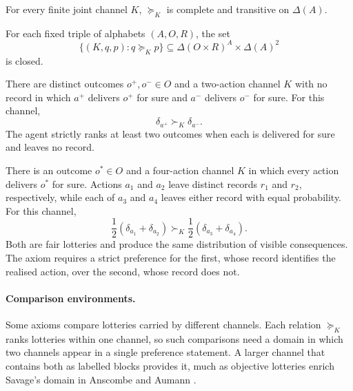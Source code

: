 \documentclass[11pt,a4paper]{article}
\theoremstyle{definition}
\newcommand{\D}{\Delta}
\newcommand{\1}{\mathbf 1}
\begin{document}
\begin{description}[leftmargin=*,style=sameline]

\item[(A1) Weak order.]
For every finite joint channel $K$, $\succeq_K$ is complete and transitive on $\D(A)$.

\item[(A2) Continuity.]
For each fixed triple of alphabets $(A,O,R)$, the set
\[
 \{(K,q,p):q\succeq_Kp\}
 \subseteq \D(O\times R)^A\times\D(A)^2
\]
is closed.


\item[(A3) Material relevance.]
There are distinct outcomes $o^+,o^-\in O$ and a two-action channel $K$ with no record in which $a^+$ delivers
$o^+$ for sure and $a^-$ delivers $o^-$ for sure.  For this channel,
\[
 \delta_{a^+}\succ_K\delta_{a^-}.
\]
The agent strictly ranks at least two outcomes when each is delivered for sure and leaves no record.

\item[(A4) Trace relevance.]
There is an outcome $o^\ast\in O$ and a four-action channel $K$ in which every action delivers $o^\ast$ for
sure.  Actions $a_1$ and $a_2$ leave distinct records $r_1$ and $r_2$, respectively, while each of $a_3$ and
$a_4$ leaves either record with equal probability.  For this channel,
\[
 \frac12(\delta_{a_1}+\delta_{a_2})
 \succ_K
 \frac12(\delta_{a_3}+\delta_{a_4}).
\]
Both are fair lotteries and produce the same distribution of visible consequences. The axiom requires a strict
preference for the first, whose record identifies the realised action, over the second, whose record does not.

\end{description}

\paragraph{Comparison environments.}
Some axioms compare lotteries carried by different channels.  Each relation $\succeq_K$ ranks lotteries within
one channel, so such comparisons need a domain in which two channels appear in a single preference statement.  A
larger channel that contains both as labelled blocks provides it, much as objective lotteries enrich Savage's
domain in Anscombe and Aumann \cite{AnscombeAumann1963}.
\end{document}
